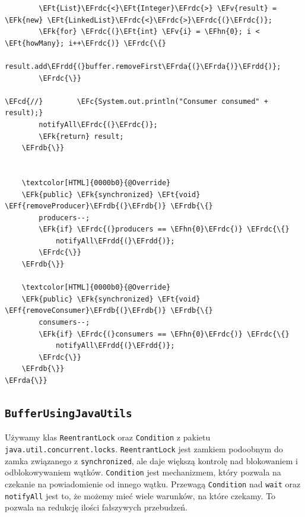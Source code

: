\documentclass[11pt]{article}
\newcommand{\EFc}[1]{\textcolor{EFc}{\textit{#1}}} %
\newcommand{\EFcd}[1]{\textcolor{EFcd}{\textit{#1}}} %
\newcommand{\EFk}[1]{\textcolor{EFk}{#1}} %
\newcommand{\EFf}[1]{\textcolor{EFf}{#1}} %
\newcommand{\EFv}[1]{\textcolor{EFv}{#1}} %
\newcommand{\EFt}[1]{\textcolor{EFt}{#1}} %
\newcommand{\EFhn}[1]{\textcolor{EFhn}{#1}} %
\newcommand{\EFrda}[1]{#1} %
\newcommand{\EFrdb}[1]{\textcolor{EFrdb}{#1}} %
\newcommand{\EFrdc}[1]{\textcolor{EFrdc}{#1}} %
\newcommand{\EFrdd}[1]{\textcolor{EFrdd}{#1}} %
\begin{document}
\begin{Code}
\begin{Verbatim}
        \EFt{List}\EFrdc{<}\EFt{Integer}\EFrdc{>} \EFv{result} = \EFk{new} \EFt{LinkedList}\EFrdc{<}\EFrdc{>}\EFrdc{(}\EFrdc{)};
        \EFk{for} \EFrdc{(}\EFt{int} \EFv{i} = \EFhn{0}; i < \EFt{howMany}; i++\EFrdc{)} \EFrdc{\{}
            result.add\EFrdd{(}buffer.removeFirst\EFrda{(}\EFrda{)}\EFrdd{)};
        \EFrdc{\}}

\EFcd{//}        \EFc{System.out.println("Consumer consumed" + result);}
        notifyAll\EFrdc{(}\EFrdc{)};
        \EFk{return} result;
    \EFrdb{\}}


    \textcolor[HTML]{0000b0}{@Override}
    \EFk{public} \EFk{synchronized} \EFt{void} \EFf{removeProducer}\EFrdb{(}\EFrdb{)} \EFrdb{\{}
        producers--;
        \EFk{if} \EFrdc{(}producers == \EFhn{0}\EFrdc{)} \EFrdc{\{}
            notifyAll\EFrdd{(}\EFrdd{)};
        \EFrdc{\}}
    \EFrdb{\}}

    \textcolor[HTML]{0000b0}{@Override}
    \EFk{public} \EFk{synchronized} \EFt{void} \EFf{removeConsumer}\EFrdb{(}\EFrdb{)} \EFrdb{\{}
        consumers--;
        \EFk{if} \EFrdc{(}consumers == \EFhn{0}\EFrdc{)} \EFrdc{\{}
            notifyAll\EFrdd{(}\EFrdd{)};
        \EFrdc{\}}
    \EFrdb{\}}
\EFrda{\}}
\end{Verbatim}
\end{Code}
\subsection*{\texttt{BufferUsingJavaUtils}}
\label{sec:org2da3ae1}
Używamy klas \texttt{ReentrantLock} oraz \texttt{Condition} z pakietu \texttt{java.util.concurrent.locks}.
\texttt{ReentrantLock} jest zamkiem podoobnym do zamka związanego z \texttt{synchronized}, ale
daje większą kontrolę nad blokowaniem i odblokowywaniem wątków. \texttt{Condition} jest
mechanizmem, który pozwala na czekanie na powiadomienie od innego wątku.
Przewagą \texttt{Condition} nad \texttt{wait} oraz \texttt{notifyAll} jest to, że możemy mieć wiele
warunków, na które czekamy. To pozwala na redukcję ilości fałszywych przebudzeń.
\end{document}
